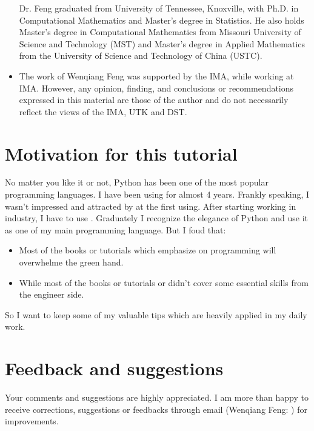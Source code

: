 \documentclass[letterpaper,12pt,english]{sphinxmanual}
\begin{document}
\begin{itemize}
Dr. Feng graduated from University of Tennessee, Knoxville, with Ph.D. in Computational Mathematics and Master’s degree in Statistics. He also holds Master’s degree in Computational Mathematics from Missouri University of Science and Technology (MST) and Master’s degree in Applied Mathematics from the University of Science and Technology of China (USTC).

\item {} 

The work of Wenqiang Feng was supported by the IMA, while working at IMA. However, any opinion, finding, and conclusions or recommendations expressed in this material are those of the author and do not necessarily reflect the views of the IMA, UTK and DST.

\end{itemize}


\section{Motivation for this tutorial}
\label{\detokenize{preface:motivation-for-this-tutorial}}
No matter you like it or not, Python has been one of the most popular programming languages.
I have been using  for almost 4 years. Frankly speaking, I wasn’t impressed and attracted
by  at the first using. After starting working in industry, I have to use . Graduately
I recognize the elegance of Python and use it as one of my main programming language. But I foud that:
\begin{itemize}
\item {} 
Most of the  books or tutorials which emphasize on programming will overwhelme the green hand.

\item {} 
While most of the  books or tutorials  or  didn’t cover some essential skills from the engineer side.

\end{itemize}

So I want to keep some of my valuable tips which are heavily applied in my daily work.


\section{Feedback and suggestions}
\label{\detokenize{preface:feedback-and-suggestions}}
Your comments and suggestions are highly appreciated. I am more than happy to receive
corrections, suggestions or feedbacks through email (Wenqiang Feng: ) for improvements.
\end{document}
